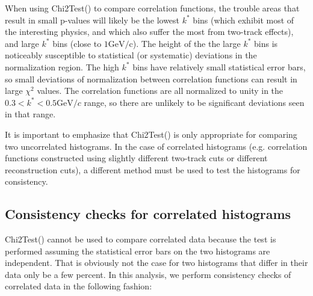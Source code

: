 When using Chi2Test() to compare correlation functions, the trouble areas that result in small p-values will likely be the lowest $k^*$ bins (which exhibit most of the interesting physics, and which also suffer the most from two-track effects), and large $k^*$ bins (close to $1 \mathrm{GeV/c}$).  The height of the the large $k^*$ bins is noticeably susceptible to statistical (or systematic) deviations in the normalization region.  The high $k^*$ bins have relatively small statistical error bars, so small deviations of normalization between correlation functions can result in large $\chi^2$ values.  The correlation functions are all normalized to unity in the $0.3 < k^* < 0.5 \mathrm{GeV}/c$ range, so there are unlikely to be significant deviations seen in that range.  

It is important to emphasize that Chi2Test() is only appropriate for comparing two uncorrelated histograms.  In the case of correlated histograms (e.g. correlation functions constructed using slightly different two-track cuts or different reconstruction cuts), a different method must be used to test the histograms for consistency.  


\subsection{Consistency checks for correlated histograms}
\label{sec:ConsistencyCheckCorrelated}
Chi2Test() cannot be used to compare correlated data because the test is performed assuming the statistical error bars on the two histograms are independent.  That is obviously not the case for two histograms that differ in their data only be a few percent.  In this analysis, we perform consistency checks of correlated data in the following fashion:

